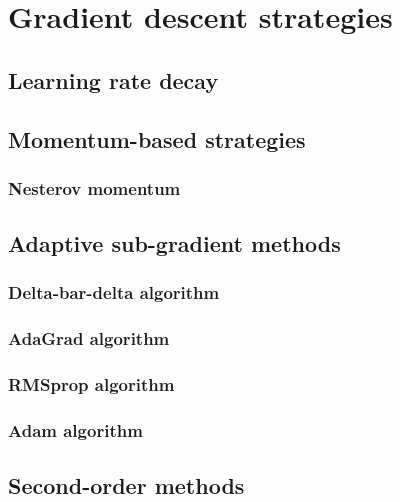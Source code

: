 \section{Gradient descent strategies}

\subsection{Learning rate decay}


\subsection{Momentum-based strategies}

\subsubsection{Nesterov momentum}


\subsection{Adaptive sub-gradient methods}

\subsubsection{Delta-bar-delta algorithm}

\subsubsection{AdaGrad algorithm}

\subsubsection{RMSprop algorithm}

\subsubsection{Adam algorithm}

\subsection{Second-order methods}

